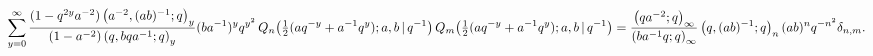 \[\sum_{y=0}^{\infty}\frac{(1-q^{2y}a^{-2})\left(a^{-2},(ab)^{-1};q\right)_{y}}{%
(1-a^{-2})\left(q,bqa^{-1};q\right)_{y}}(ba^{-1})^{y}q^{y^{2}}\*\mathop{Q_{n}%
\/}\nolimits\!\left(\tfrac{1}{2}(aq^{-y}+a^{-1}q^{y});a,b\,|\,q^{-1}\right)\*%
\mathop{Q_{m}\/}\nolimits\!\left(\tfrac{1}{2}(aq^{-y}+a^{-1}q^{y});a,b\,|\,q^{%
-1}\right)=\frac{\left(qa^{-2};q\right)_{\infty}}{\left(ba^{-1}q;q\right)_{%
\infty}}\left(q,(ab)^{-1};q\right)_{n}(ab)^{n}q^{-n^{2}}\delta_{n,m}.\]